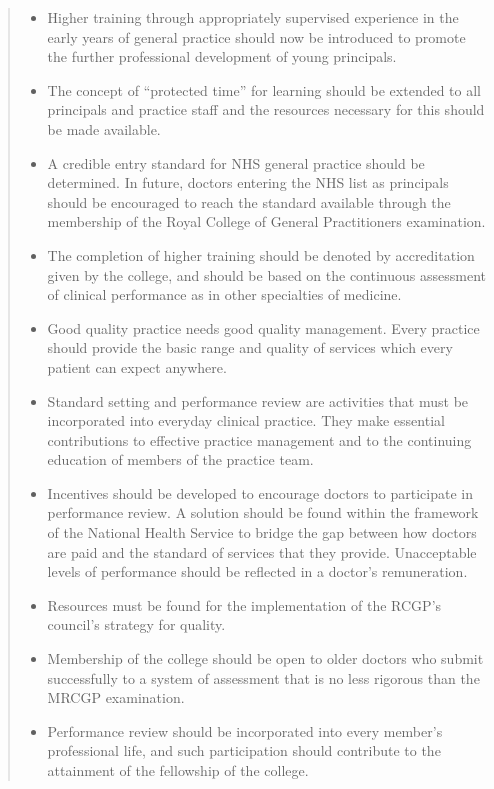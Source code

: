 \documentclass[12pt]{article}
\begin{document}
\begin{quote}
\begin{itemize}
  \item Higher training through appropriately supervised experience in the early years of general practice should now be introduced to promote the further professional development of young principals.
  \item The concept of ``protected time'' for learning should be extended to all principals and practice staff and the resources necessary for this should be made available.
  \item A credible entry standard for NHS general practice should be determined. In future, doctors entering the NHS list as principals should be encouraged to reach the standard available through the membership of the Royal College of General Practitioners examination.
  \item The completion of higher training should be denoted by accreditation given by the college, and should be based on the continuous assessment of clinical performance as in other specialties of medicine.
  \item Good quality practice needs good quality management. Every practice should provide the basic range and quality of services which every patient can expect anywhere.
  \item Standard setting and performance review are activities that must be incorporated into everyday clinical practice. They make essential contributions to effective practice management and to the continuing education of members of the practice team.
  \item Incentives should be developed to encourage doctors to participate in performance review. A solution should be found within the framework of the National Health Service to bridge the gap between how doctors are paid and the standard of services that they provide. Unacceptable levels of performance should be reflected in a doctor's remuneration.
  \item Resources must be found for the implementation of the RCGP's council's strategy for quality.
  \item Membership of the college should be open to older doctors who submit successfully to a system of assessment that is no less rigorous than the MRCGP examination.
  \item Performance review should be incorporated into every member's professional life, and such participation should contribute to the attainment of the fellowship of the college.
\end{itemize}
\end{quote}
\end{document}

